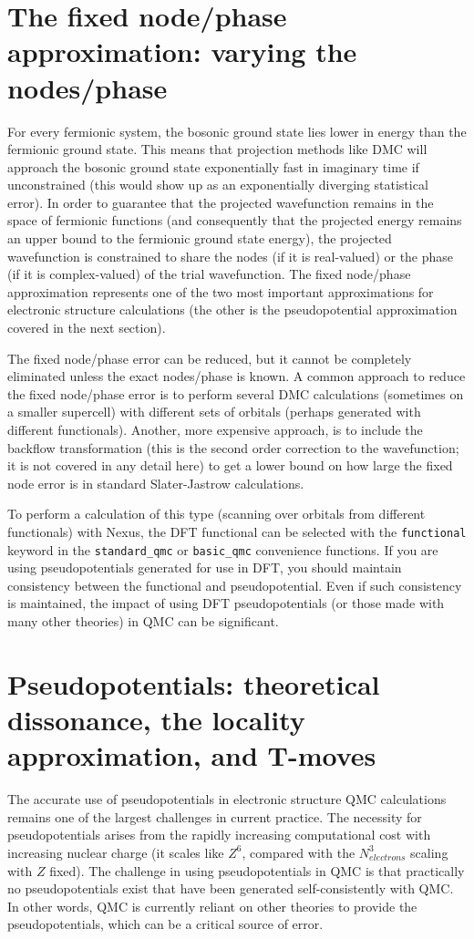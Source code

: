 \documentclass[oneside,11pt]{memoir}
\numberwithin{equation}{section}
\begin{document}
\section{The fixed node/phase approximation: varying the nodes/phase}
For every fermionic system, the bosonic ground state lies lower in energy than 
the fermionic ground state.  This means that projection methods like DMC 
will approach the bosonic ground state exponentially fast in imaginary time if 
unconstrained (this would show up as an exponentially diverging statistical 
error).  In order to guarantee that the projected wavefunction remains in the 
space of fermionic functions (and consequently that the projected energy 
remains an upper bound to the fermionic ground state energy), the projected 
wavefunction is constrained to share the nodes (if it is real-valued) or the 
phase (if it is complex-valued) of the trial wavefunction.  The fixed 
node/phase approximation represents one of the two most important 
approximations for electronic structure calculations (the other is the 
pseudopotential approximation covered in the next section).  

The fixed node/phase error can be reduced, but it cannot be completely 
eliminated unless the exact nodes/phase is known.  A common approach to reduce 
the fixed node/phase error is to perform several DMC calculations (sometimes 
on a smaller supercell) with different sets of orbitals (perhaps generated 
with different functionals).  Another, more expensive approach, is to include 
the backflow transformation (this is the second order correction to the 
wavefunction; it is not covered in any detail here) to get a lower bound on 
how large the fixed node error is in standard Slater-Jastrow calculations.

To perform a calculation of this type (scanning over orbitals from different 
functionals) with Nexus, the DFT functional can be selected 
with the \texttt{functional} keyword in the  \texttt{standard\_qmc} or 
\texttt{basic\_qmc} convenience functions.  If you are using pseudopotentials 
generated for use in DFT, you should maintain consistency between the 
functional and pseudopotential.  Even if such consistency is maintained, the 
impact of using DFT pseudopotentials (or those made with many other theories) 
in QMC can be significant.


\section{Pseudopotentials: theoretical dissonance, the locality approximation, and T-moves}
The accurate use of pseudopotentials in electronic structure QMC calculations 
remains one of the largest challenges in current practice.  The necessity for 
pseudopotentials arises from the rapidly increasing computational cost with 
increasing nuclear charge (it scales like $Z^6$, compared with the 
$N_{electrons}^3$ scaling with $Z$ fixed).  The challenge in using 
pseudopotentials in QMC is that practically no pseudopotentials exist that have 
been generated self-consistently with QMC.  In other words, QMC is currently 
reliant on other theories to provide the pseudopotentials, which can be a 
critical source of error.
\end{document}
